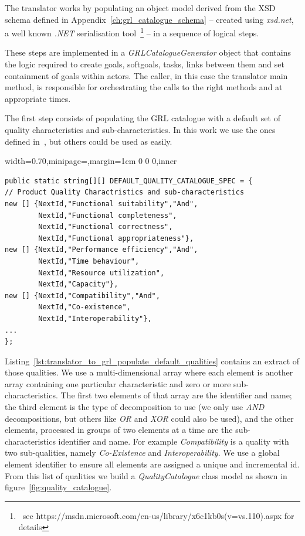 \documentclass[dissertation,final]{softeng}
\newenvironment{featurecode}[1]
{ \lrbox\featurebox \begin{adjustbox}{width=#1\textwidth,minipage=\textwidth,margin=1cm 0 0 0,inner} }
{ \end{adjustbox}\endlrbox}
\newenvironment{featurelist}[2]
{
\newcommand{\setcaption}{\caption{#1}}
\newcommand{\setlabel}{\label{#2}}
}
{\begin{listing}[h!]\centering\usebox\featurebox\setcaption\setlabel\end{listing}}
\begin{document}
The translator works by populating an object model derived from the XSD schema defined in Appendix~\ref{ch:grl_catalogue_schema} -- created using \emph{xsd.net}, a well known \emph{.NET} serialisation tool~\footnote{~see https://msdn.microsoft.com/en-us/library/x6c1kb0s(v=vs.110).aspx for details} -- in a sequence of logical steps. 

These steps are implemented in a \emph{GRLCatalogueGenerator} object that contains the logic required to create goals, softgoals, tasks, links between them and set containment of goals within actors. The caller, in this case the translator main method, is responsible for orchestrating the calls to the right methods and at appropriate times.

The first step consists of populating the GRL catalogue with a default set of quality characteristics and sub-characteristics. In this work we use the ones defined in~, but others could be used as easily.

\begin{featurelist}{Translator to GRL -- default quality set (Partial)}{lst:translator_to_grl_populate_default_qualities}
\begin{featurecode}{0.70}
\begin{verbatim}
public static string[][] DEFAULT_QUALITY_CATALOGUE_SPEC = {
// Product Quality Charactristics and sub-characteristics
new [] {NextId,"Functional suitability","And", 
        NextId,"Functional completeness", 
        NextId,"Functional correctness", 
        NextId,"Functional appropriateness"},
new [] {NextId,"Performance efficiency","And", 
        NextId,"Time behaviour", 
        NextId,"Resource utilization", 
        NextId,"Capacity"},
new [] {NextId,"Compatibility","And", 
        NextId,"Co-existence", 
        NextId,"Interoperability"},
...
};       
\end{verbatim}
\end{featurecode}
\end{featurelist}

Listing~\ref{lst:translator_to_grl_populate_default_qualities} contains an extract of those qualities. We use a multi-dimensional array where each element is another array containing one particular characteristic and zero or more sub-characteristics. The first two elements of that array are the identifier and name; the third element is the type of decomposition to use (we only use \emph{AND} decompositions, but others like \emph{OR} and \emph{XOR} could also be used), and the other elements, processed in groups of two elements at a time are the sub-characteristics identifier and name. For example \emph{Compatibility} is a quality with two sub-qualities, namely \emph{Co-Existence} and \emph{Interoperability}. We use a global element identifier to ensure all elements are assigned a unique and incremental id. From this list of qualities we build a \emph{QualityCatalogue} class model as shown in figure~\ref{fig:quality_catalogue}.
\end{document}
